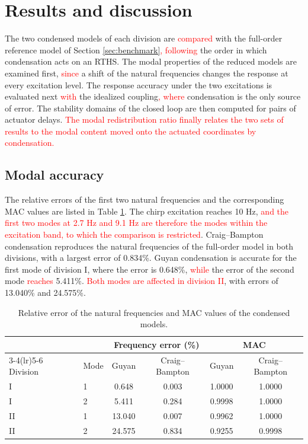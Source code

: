 \documentclass[11pt,a4paper]{article}
\numberwithin{equation}{section}
\newcommand{\rev}[1]{\textcolor{red}{#1}}
\begin{document}
\section{Results and discussion} \label{sec5}

The two condensed models of each division are \rev{compared} with the full-order reference model of Section \ref{sec:benchmark}\rev{, following} the order in which condensation acts on an RTHS. The modal properties of the reduced models are examined first, \rev{since} a shift of the natural frequencies changes the response at every excitation level. The response accuracy under the two excitations is evaluated next\rev{ with} the idealized coupling\rev{, where} condensation is the only source of error. The stability domains of the closed loop are then computed for pairs of actuator delays. \rev{The modal redistribution ratio finally relates the two sets of results to the modal content moved onto the actuated coordinates by condensation.}

\subsection{Modal accuracy}
\label{sec:modal-accuracy}

The relative errors of the first two natural frequencies and the corresponding MAC values are listed in Table \ref{tab:modal}. The chirp excitation reaches 10 Hz, \rev{and the first two modes at 2.7 Hz and 9.1 Hz are therefore the modes within the excitation band, to which the comparison is restricted}. Craig--Bampton condensation reproduces the natural frequencies of the full-order model in both divisions, with a largest error of 0.834\%. Guyan condensation is accurate for the first mode of division I, where the error is 0.648\%, \rev{while} the error of the second mode \rev{reaches} 5.411\%. \rev{Both modes are affected in division II}, with errors of 13.040\% and 24.575\%.

\begin{table}[htbp]
	\centering
	\caption{Relative error of the natural frequencies and MAC values of the condensed models.}
	\label{tab:modal}
	\begin{tabular}{llcccc}
		\toprule
		& & \multicolumn{2}{c}{Frequency error (\%)} & \multicolumn{2}{c}{MAC}\\
		\cmidrule(lr){3-4}\cmidrule(lr){5-6}
		Division & Mode & Guyan & Craig--Bampton & Guyan & Craig--Bampton\\
		\midrule
		I  & 1 & 0.648  & 0.003 & 1.0000 & 1.0000\\
		I  & 2 & 5.411  & 0.284 & 0.9998 & 1.0000\\
		\midrule
		II & 1 & 13.040 & 0.007 & 0.9962 & 1.0000\\
		II & 2 & 24.575 & 0.834 & 0.9255 & 0.9998\\
		\bottomrule
	\end{tabular}
\end{table}
\end{document}

